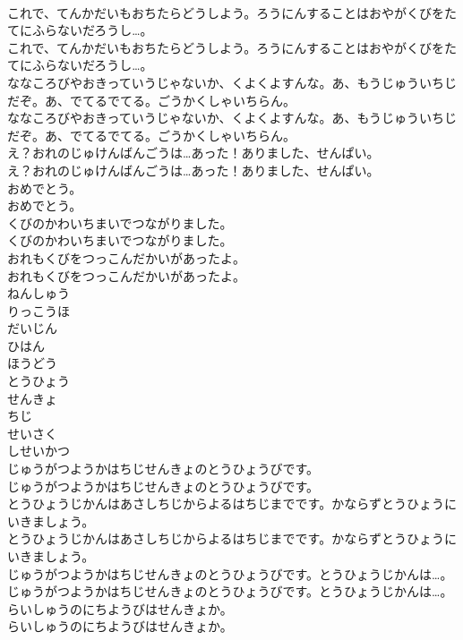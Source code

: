 \documentclass[8pt]{extreport}
\begin{document}
\begin{CJK}{UTF8}{min}
\\	これで、てんかだいもおちたらどうしよう。ろうにんすることはおやがくびをたてにふらないだろうし…。
\\	これで、てんかだいもおちたらどうしよう。ろうにんすることはおやがくびをたてにふらないだろうし…。
\\	ななころびやおきっていうじゃないか、くよくよすんな。あ、もうじゅういちじだぞ。あ、でてるでてる。ごうかくしゃいちらん。
\\	ななころびやおきっていうじゃないか、くよくよすんな。あ、もうじゅういちじだぞ。あ、でてるでてる。ごうかくしゃいちらん。
\\	え？おれのじゅけんばんごうは…あった！ありました、せんぱい。
\\	え？おれのじゅけんばんごうは…あった！ありました、せんぱい。
\\	おめでとう。
\\	おめでとう。
\\	くびのかわいちまいでつながりました。
\\	くびのかわいちまいでつながりました。
\\	おれもくびをつっこんだかいがあったよ。
\\	おれもくびをつっこんだかいがあったよ。
\\	ねんしゅう
\\	りっこうほ
\\	だいじん
\\	ひはん
\\	ほうどう
\\	とうひょう
\\	せんきょ
\\	ちじ
\\	せいさく
\\	しせいかつ
\\	じゅうがつようかはちじせんきょのとうひょうびです。
\\	じゅうがつようかはちじせんきょのとうひょうびです。
\\	とうひょうじかんはあさしちじからよるはちじまでです。かならずとうひょうにいきましょう。
\\	とうひょうじかんはあさしちじからよるはちじまでです。かならずとうひょうにいきましょう。
\\	じゅうがつようかはちじせんきょのとうひょうびです。とうひょうじかんは…。
\\	じゅうがつようかはちじせんきょのとうひょうびです。とうひょうじかんは…。
\\	らいしゅうのにちようびはせんきょか。
\\	らいしゅうのにちようびはせんきょか。

\end{CJK}
\end{document}
